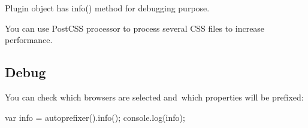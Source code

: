 Plugin object has {\ttfamily info()} method for debugging purpose.

You can use Post\+C\+SS processor to process several C\+SS files to increase performance.

\subsection*{Debug}

You can check which browsers are selected and which properties will be prefixed\+:


\begin{DoxyCode}
var info = autoprefixer().info();
console.log(info);
\end{DoxyCode}
 